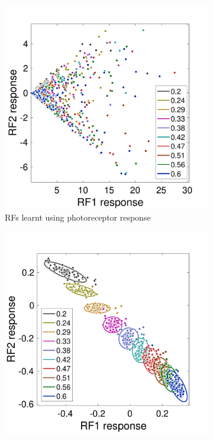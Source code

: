 \documentclass{jov}
\begin{document}
\begin{figure}
\centering
    \begin{subfigure}[b]{0.3	 \textwidth}   
        \includegraphics[width=\textwidth]{../Figures/Figure12/Figure12_a.pdf}
        \caption{RFs learnt using photoreceptor response}
        \label{fig:isomerizationFails}
    \end{subfigure}
        \begin{subfigure}[b]{0.3 \textwidth}
        \includegraphics[width=\textwidth]{../Figures/Figure12/Figure12_b.pdf}

\end{subfigure}
\end{figure}
\end{document}
